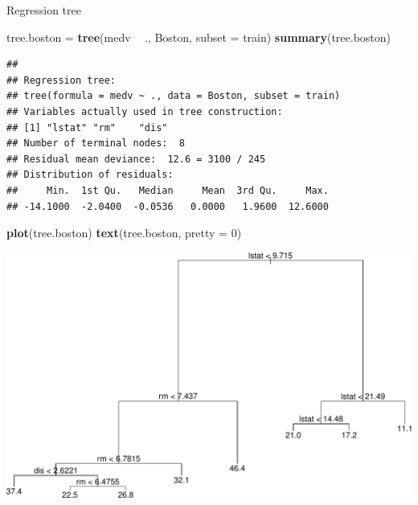 \documentclass[ignorenonframetext,]{beamer}
\newenvironment{Shaded}{\begin{snugshade}}{\end{snugshade}}
\newcommand{\KeywordTok}[1]{\textcolor[rgb]{0.13,0.29,0.53}{\textbf{#1}}}
\newcommand{\DataTypeTok}[1]{\textcolor[rgb]{0.13,0.29,0.53}{#1}}
\newcommand{\DecValTok}[1]{\textcolor[rgb]{0.00,0.00,0.81}{#1}}
\newcommand{\StringTok}[1]{\textcolor[rgb]{0.31,0.60,0.02}{#1}}
\newcommand{\OperatorTok}[1]{\textcolor[rgb]{0.81,0.36,0.00}{\textbf{#1}}}
\newcommand{\NormalTok}[1]{#1}
\begin{document}
\begin{frame}[fragile]

\begin{block}{Regression tree}

\begin{Shaded}
\begin{Highlighting}[]
\NormalTok{tree.boston =}\StringTok{ }\KeywordTok{tree}\NormalTok{(medv }\OperatorTok{~}\StringTok{ }\NormalTok{., Boston, }\DataTypeTok{subset =}\NormalTok{ train)}
\KeywordTok{summary}\NormalTok{(tree.boston)}
\end{Highlighting}
\end{Shaded}

\begin{verbatim}
## 
## Regression tree:
## tree(formula = medv ~ ., data = Boston, subset = train)
## Variables actually used in tree construction:
## [1] "lstat" "rm"    "dis"  
## Number of terminal nodes:  8 
## Residual mean deviance:  12.6 = 3100 / 245 
## Distribution of residuals:
##     Min.  1st Qu.   Median     Mean  3rd Qu.     Max. 
## -14.1000  -2.0400  -0.0536   0.0000   1.9600  12.6000
\end{verbatim}

\begin{Shaded}
\begin{Highlighting}[]
\KeywordTok{plot}\NormalTok{(tree.boston)}
\KeywordTok{text}\NormalTok{(tree.boston, }\DataTypeTok{pretty =} \DecValTok{0}\NormalTok{)}
\end{Highlighting}
\end{Shaded}

\includegraphics{8TreesBEAMER_files/figure-beamer/unnamed-chunk-39-1.pdf}

\end{block}

\end{frame}
\end{document}
